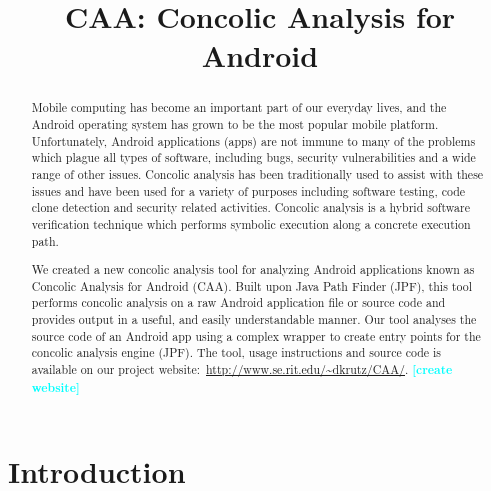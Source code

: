 \documentclass[conference]{IEEEtran}
\newcommand{\todo}[1]{\textcolor{cyan}{\textbf{[#1]}}}
\begin{document}
\title{CAA: Concolic Analysis for Android}


\author{
}

\maketitle


\begin{abstract}

Mobile computing has become an important part of our everyday lives, and the Android operating system has grown to be the most popular mobile platform. Unfortunately, Android applications (apps) are not immune to many of the problems which plague all types of software, including bugs, security vulnerabilities and a wide range of other issues. Concolic analysis has been traditionally used to assist with these issues and have been used for a variety of purposes including software testing, code clone detection and security related activities. Concolic analysis is a hybrid software verification technique which performs symbolic execution along a concrete execution path.

We created a new concolic analysis tool for analyzing Android applications known as Concolic Analysis for Android (CAA). Built upon Java Path Finder (JPF), this tool performs concolic analysis on a raw Android application file or source code and provides output in a useful, and easily understandable manner. Our tool analyses the source code of an Android app using a complex wrapper to create entry points for the concolic analysis engine (JPF). The tool, usage instructions and source code is available on our project website:~\url{http://www.se.rit.edu/~dkrutz/CAA/}.  \todo{create website}


\end{abstract}
\IEEEpeerreviewmaketitle


\section{Introduction}
\end{document}
